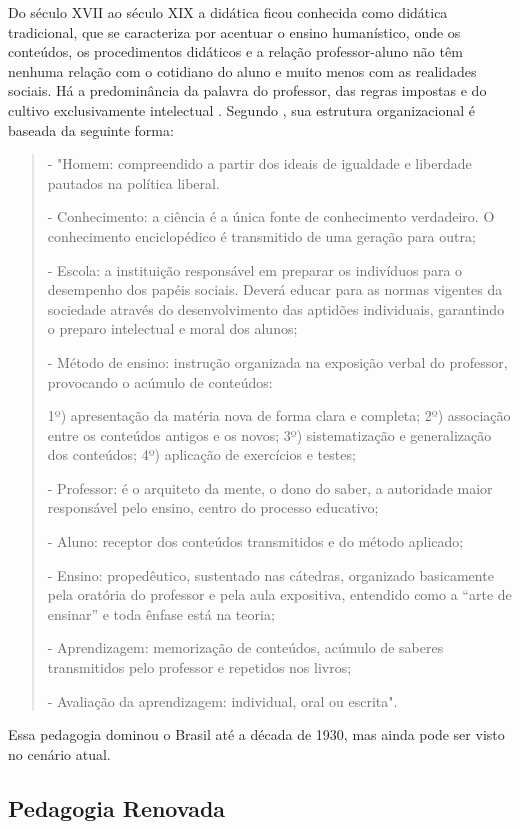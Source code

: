 Do século XVII ao século XIX a didática ficou conhecida como didática tradicional, que se caracteriza por acentuar o ensino humanístico, onde os conteúdos, os procedimentos didáticos e a relação professor-aluno não têm nenhuma relação com o cotidiano do aluno e muito menos com as realidades sociais. Há a predominância da palavra do professor, das regras impostas e do cultivo exclusivamente intelectual \cite{libaneo}.
Segundo \cite{larchert}, sua estrutura organizacional é baseada da seguinte forma:
\begin{quote} - "Homem: compreendido a partir dos ideais de igualdade e liberdade pautados na política liberal.

- Conhecimento: a ciência é a única fonte de conhecimento verdadeiro. O conhecimento enciclopédico é transmitido de uma geração para outra;
	
- Escola: a instituição responsável em preparar os indivíduos para o desempenho dos papéis sociais. Deverá educar para as normas vigentes da sociedade através do desenvolvimento das aptidões individuais, garantindo o preparo intelectual e moral dos alunos;
	
- Método de ensino: instrução organizada na exposição verbal do professor, provocando o acúmulo de conteúdos: 
	
	1º) apresentação da matéria nova de forma clara e completa;
	2º) associação entre os conteúdos antigos e os novos;	
	3º) sistematização e generalização dos conteúdos;
	4º) aplicação de exercícios e testes;

- Professor: é o arquiteto da mente, o dono do saber, a autoridade maior responsável pelo ensino, centro do processo educativo;

- Aluno: receptor dos conteúdos transmitidos e do método aplicado;

- Ensino: propedêutico, sustentado nas cátedras, organizado basicamente pela oratória do professor e pela aula expositiva, entendido como a “arte de ensinar” e toda ênfase está na teoria;
	
- Aprendizagem: memorização de conteúdos, acúmulo de saberes transmitidos pelo professor e repetidos nos livros;
	
- Avaliação da aprendizagem: individual, oral ou escrita".	
\end{quote}
Essa pedagogia dominou o Brasil até a década de 1930, mas ainda pode ser visto no cenário atual.

\subsection{Pedagogia Renovada}\label{sec:ped_renov}

